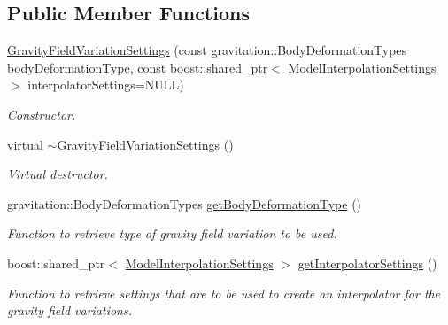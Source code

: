 \subsection*{Public Member Functions}
\begin{DoxyCompactItemize}
\item 
\hyperlink{classtudat_1_1simulation__setup_1_1GravityFieldVariationSettings_a7bbe8bedf9065f592dad15b251071992}{Gravity\+Field\+Variation\+Settings} (const gravitation\+::\+Body\+Deformation\+Types body\+Deformation\+Type, const boost\+::shared\+\_\+ptr$<$ \hyperlink{classtudat_1_1simulation__setup_1_1ModelInterpolationSettings}{Model\+Interpolation\+Settings} $>$ interpolator\+Settings=N\+U\+LL)
\begin{DoxyCompactList}\small\item\em Constructor. \end{DoxyCompactList}\item 
virtual \hyperlink{classtudat_1_1simulation__setup_1_1GravityFieldVariationSettings_a17e41bc6135c61efa9c744f4113dbee3}{$\sim$\+Gravity\+Field\+Variation\+Settings} ()\hypertarget{classtudat_1_1simulation__setup_1_1GravityFieldVariationSettings_a17e41bc6135c61efa9c744f4113dbee3}{}\label{classtudat_1_1simulation__setup_1_1GravityFieldVariationSettings_a17e41bc6135c61efa9c744f4113dbee3}

\begin{DoxyCompactList}\small\item\em Virtual destructor. \end{DoxyCompactList}\item 
gravitation\+::\+Body\+Deformation\+Types \hyperlink{classtudat_1_1simulation__setup_1_1GravityFieldVariationSettings_acee7cd815d479636cd2f5818da7169ea}{get\+Body\+Deformation\+Type} ()
\begin{DoxyCompactList}\small\item\em Function to retrieve type of gravity field variation to be used. \end{DoxyCompactList}\item 
boost\+::shared\+\_\+ptr$<$ \hyperlink{classtudat_1_1simulation__setup_1_1ModelInterpolationSettings}{Model\+Interpolation\+Settings} $>$ \hyperlink{classtudat_1_1simulation__setup_1_1GravityFieldVariationSettings_ab00af425ca496794a2f3b0f3449f7719}{get\+Interpolator\+Settings} ()
\begin{DoxyCompactList}\small\item\em Function to retrieve settings that are to be used to create an interpolator for the gravity field variations. \end{DoxyCompactList}\end{DoxyCompactItemize}
